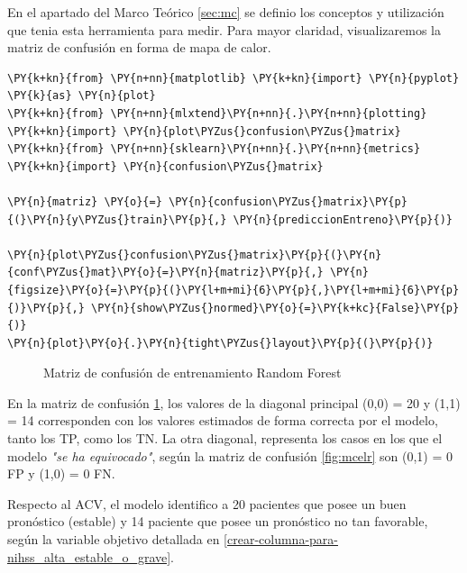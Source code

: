 	En el apartado del Marco Teórico \ref{sec:mc} se definio los conceptos y utilización que tenia esta herramienta para medir. Para mayor claridad, visualizaremos la matriz de confusión en forma de mapa de calor.

    \begin{tcolorbox}[breakable, size=fbox, boxrule=1pt, pad at break*=1mm,colback=cellbackground, colframe=cellborder]
\begin{Verbatim}[commandchars=\\\{\}]
\PY{k+kn}{from} \PY{n+nn}{matplotlib} \PY{k+kn}{import} \PY{n}{pyplot} \PY{k}{as} \PY{n}{plot}
\PY{k+kn}{from} \PY{n+nn}{mlxtend}\PY{n+nn}{.}\PY{n+nn}{plotting} \PY{k+kn}{import} \PY{n}{plot\PYZus{}confusion\PYZus{}matrix}
\PY{k+kn}{from} \PY{n+nn}{sklearn}\PY{n+nn}{.}\PY{n+nn}{metrics} \PY{k+kn}{import} \PY{n}{confusion\PYZus{}matrix}

\PY{n}{matriz} \PY{o}{=} \PY{n}{confusion\PYZus{}matrix}\PY{p}{(}\PY{n}{y\PYZus{}train}\PY{p}{,} \PY{n}{prediccionEntreno}\PY{p}{)}

\PY{n}{plot\PYZus{}confusion\PYZus{}matrix}\PY{p}{(}\PY{n}{conf\PYZus{}mat}\PY{o}{=}\PY{n}{matriz}\PY{p}{,} \PY{n}{figsize}\PY{o}{=}\PY{p}{(}\PY{l+m+mi}{6}\PY{p}{,}\PY{l+m+mi}{6}\PY{p}{)}\PY{p}{,} \PY{n}{show\PYZus{}normed}\PY{o}{=}\PY{k+kc}{False}\PY{p}{)}
\PY{n}{plot}\PY{o}{.}\PY{n}{tight\PYZus{}layout}\PY{p}{(}\PY{p}{)}
\end{Verbatim}
\end{tcolorbox}

\begin{center}
    	\begin{figure}[H]
	\centering
	\caption{Matriz de confusión de entrenamiento Random Forest}
	\label{fig:mcerf}
	\end{figure}
\end{center}
    
    En la matriz de confusión \ref{fig:mcerf}, los valores de la diagonal principal (0,0) = 20 y (1,1) = 14 corresponden con los valores estimados de forma correcta por el modelo, tanto los TP, como los TN. La otra diagonal, representa los casos en los que el modelo \textit{"se ha equivocado"}, según la matriz de confusión \ref{fig:mcelr} son (0,1) = 0 FP y (1,0) = 0 FN.
\par Respecto al ACV, el modelo identifico a 20 pacientes que posee un buen pronóstico (estable) y 14 paciente que posee un pronóstico no tan favorable, según la variable objetivo detallada en \ref{crear-columna-para-nihss_alta_estable_o_grave}.\\
